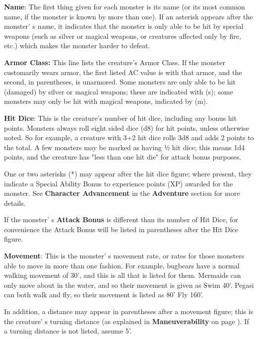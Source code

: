 \documentclass[a4paper,twoside,openany,10pt]{book}
\begin{document}
\begin{multicols}{2}


\textbf{Name}: The first thing given for each monster is its name (or its most common name, if the monster is known by more than one). If an asterisk appears after the monster' s name, it indicates that the monster is only able to be hit by special weapons (such as silver or magical weapons, or creatures affected only by fire, etc.) which makes
the monster harder to defeat.

\textbf{Armor Class:} This line lists the creature's Armor Class. If the monster customarily wears armor, the first listed AC value is with that armor, and the second, in parentheses, is unarmored. Some monsters are only able to be hit (damaged) by silver or magical weapons; these are indicated with (s); some monsters may only be hit with magical weapons, indicated by (m).

\textbf{Hit Dice}: This is the creature's number of hit dice, including any bonus hit points. Monsters always roll eight sided dice (d8) for hit points, unless otherwise noted. So for example, a creature with 3+2 hit dice rolls 3d8 and adds 2 points to the total. A few monsters may be marked as having ½ hit dice; this means 1d4 points, and the creature has "less than one hit die" for attack bonus purposes.

One or two asterisks (*) may appear after the hit dice figure; where present, they indicate a Special Ability Bonus to experience points (XP) awarded for the monster. See \textbf{Character Advancement }in the \textbf{Adventure }section for more details.

If the monster' s \textbf{Attack Bonus} is different than its number of Hit Dice, for convenience the Attack Bonus will be listed in parentheses after the Hit Dice figure.

\textbf{Movement}: This is the monster' s movement rate, or rates for those monsters able to move in more than one fashion. For example, bugbears have a normal walking movement of 30', and this is all that is listed for them. Mermaids can only move about in the water, and so their movement is given as Swim 40'. Pegasi can both walk and fly, so their movement is listed as 80' Fly 160'.

In addition, a distance may appear in parentheses after a movement figure; this is the creature' s turning distance (as explained in \textbf{Maneuverability} on page \hyperlink{maneuverability}{\pageref{maneuverability}}). If a turning distance is not listed, assume 5'.


\end{multicols}
\end{document}
